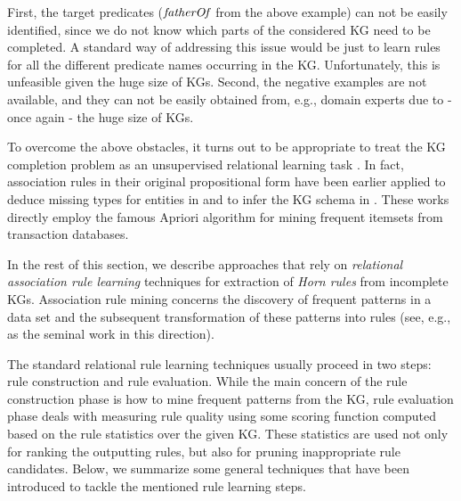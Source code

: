 First, the target predicates ($\mathit{fatherOf}$ from the above example) can
not be easily identified, since we do not know which parts of the considered KG need to
 be completed. A standard way of addressing this issue would be just to learn rules for all
 the different predicate names occurring in the KG. Unfortunately, this is unfeasible
 given the huge size of KGs. Second, the negative examples are not available,
 and they can not be easily obtained from, e.g., domain experts due to - once again
 - the huge size of KGs. %

To overcome the above obstacles, it turns out to be appropriate to treat
the KG completion problem as an unsupervised relational learning task \cite{amie}.
In fact, association rules in their original propositional form have been earlier applied to deduce missing types for entities in \cite{typeinduction} and to
infer the KG schema in \cite{statisticalschema}. These works directly employ the famous Apriori algorithm for mining frequent itemsets from transaction databases.

In the rest of this section, we describe approaches that rely on \emph{relational association rule learning} techniques for extraction of \emph{Horn rules} from incomplete KGs. 
Association rule mining concerns the discovery of frequent patterns in a data set and the subsequent transformation of these patterns into rules
(see, e.g., \cite{DBLP:conf/ilp/DehaspeR97} as the seminal work in this direction). %

The standard relational rule learning techniques usually proceed in two 
steps: rule construction and rule evaluation. While the main concern of the rule construction phase is how to mine frequent patterns from the KG, 
rule evaluation phase deals with measuring rule quality %
using some scoring function computed based on the rule statistics over the given KG. These statistics are used not only for ranking the outputting rules, but also for pruning inappropriate rule candidates. Below, we summarize some general techniques that have been introduced to tackle the mentioned rule learning steps.


